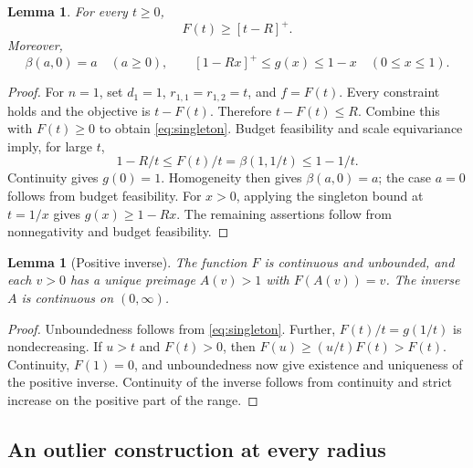 \documentclass[11pt]{article}
\numberwithin{equation}{section}
\newtheorem{lemma}[theorem]{Lemma}
\theoremstyle{definition}
\begin{document}
\begin{lemma}\label{lem:singleton}
For every $t\ge0$,
\begin{equation}\label{eq:singleton}
 F(t)\ge[t-R]^+.
\end{equation}
Moreover,
\begin{equation}\label{eq:zero}
 \beta(a,0)=a\quad(a\ge0),
 \qquad
 [1-Rx]^+\le g(x)\le1-x\quad(0\le x\le1).
\end{equation}
\end{lemma}
\begin{proof}
For $n=1$, set $d_1=1$, $r_{1,1}=r_{1,2}=t$, and $f=F(t)$.
Every constraint holds and the objective is $t-F(t)$. Therefore
$t-F(t)\le R$. Combine this with $F(t)\ge0$ to obtain
\eqref{eq:singleton}. Budget feasibility and scale equivariance imply, for
large $t$,
\[
 1-R/t\le F(t)/t=\beta(1,1/t)\le1-1/t.
\]
Continuity gives $g(0)=1$. Homogeneity then gives $\beta(a,0)=a$; the case
$a=0$ follows from budget feasibility. For $x>0$, applying the singleton
bound at $t=1/x$ gives $g(x)\ge1-Rx$. The remaining assertions follow from
nonnegativity and budget feasibility.
\end{proof}

\begin{lemma}[Positive inverse]\label{lem:inverse}
The function $F$ is continuous and unbounded, and each $v>0$ has a unique
preimage $A(v)>1$ with $F(A(v))=v$. The inverse $A$ is continuous on
$(0,\infty)$.
\end{lemma}
\begin{proof}
Unboundedness follows from \eqref{eq:singleton}. Further,
$F(t)/t=g(1/t)$ is nondecreasing. If $u>t$ and $F(t)>0$, then
$F(u)\ge(u/t)F(t)>F(t)$. Continuity, $F(1)=0$, and unboundedness now give
existence and uniqueness of the positive inverse. Continuity of the inverse
follows from continuity and strict increase on the positive part of the
range.
\end{proof}

\subsection{An outlier construction at every radius}
\end{document}
